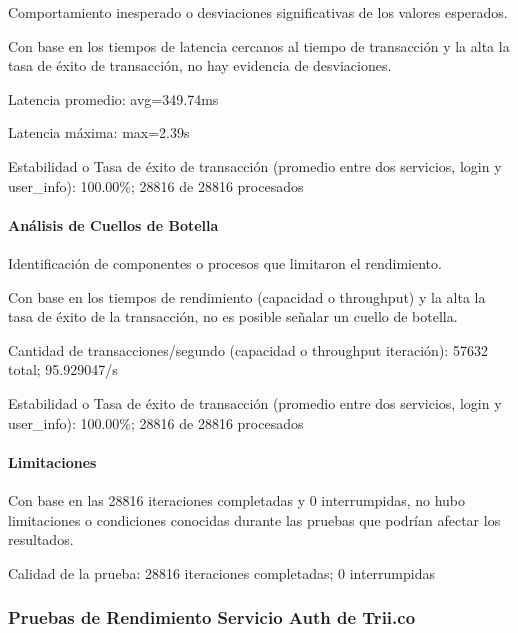 \documentclass[
  paper=a4,
  ,captions=tableheading
]{scrartcl}
\renewenvironment{quote}{\begin{customblockquote}\list{}{\rightmargin=0em\leftmargin=0em}%
\item\relax\color{blockquote-text}\ignorespaces}{\unskip\unskip\endlist\end{customblockquote}}
\begin{document}
Comportamiento inesperado o desviaciones significativas de los valores
esperados.

Con base en los tiempos de latencia cercanos al tiempo de transacción y
la alta la tasa de éxito de transacción, no hay evidencia de
desviaciones.

\begin{quote}
Latencia promedio: avg=349.74ms

Latencia máxima: max=2.39s

Estabilidad o Tasa de éxito de transacción (promedio entre dos
servicios, login y user\_info): 100.00\%; 28816 de 28816 procesados
\end{quote}

\paragraph{Análisis de Cuellos de
Botella}\label{sec:anuxe1lisis-de-cuellos-de-botella}

Identificación de componentes o procesos que limitaron el rendimiento.

Con base en los tiempos de rendimiento (capacidad o throughput) y la
alta la tasa de éxito de la transacción, no es posible señalar un cuello
de botella.

\begin{quote}
Cantidad de transacciones/segundo (capacidad o throughput iteración):
57632 total; 95.929047/s

Estabilidad o Tasa de éxito de transacción (promedio entre dos
servicios, login y user\_info): 100.00\%; 28816 de 28816 procesados
\end{quote}

\paragraph{Limitaciones}\label{sec:limitaciones}

Con base en las 28816 iteraciones completadas y 0 interrumpidas, no hubo
limitaciones o condiciones conocidas durante las pruebas que podrían
afectar los resultados.

\begin{quote}
Calidad de la prueba: 28816 iteraciones completadas; 0 interrumpidas
\end{quote}

\subsubsection{Pruebas de Rendimiento Servicio Auth de
Trii.co}\label{sec:pruebas-de-rendimiento-servicio-auth-de-trii.co}
\end{document}
